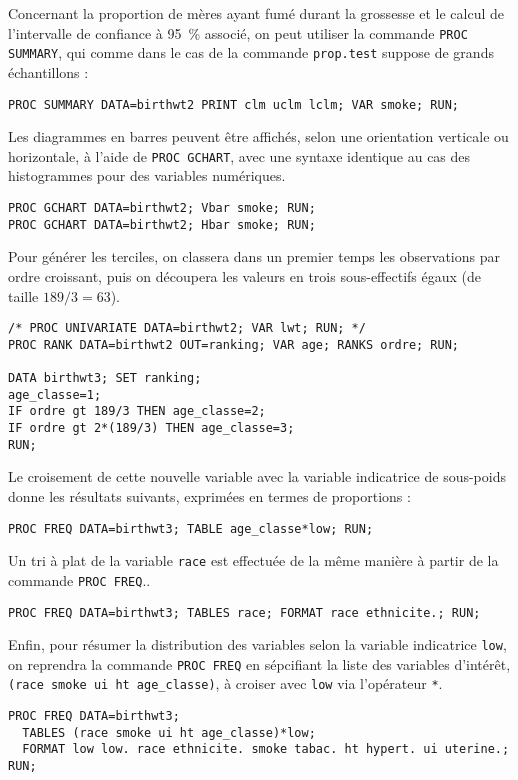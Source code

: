 Concernant la proportion de mères ayant fumé durant la grossesse et
le calcul de l'intervalle de confiance à 95~\% associé, on peut utiliser la
commande \texttt{PROC SUMMARY}, qui comme dans le cas de la commande \R
\texttt{prop.test} suppose de grands échantillons :
\begin{verbatim}
PROC SUMMARY DATA=birthwt2 PRINT clm uclm lclm; VAR smoke; RUN;
\end{verbatim}

Les diagrammes en barres peuvent être affichés, selon une orientation
verticale ou horizontale, à l'aide de \texttt{PROC GCHART}, avec une syntaxe
identique au cas des histogrammes pour des variables numériques.
\begin{verbatim}
PROC GCHART DATA=birthwt2; Vbar smoke; RUN;
PROC GCHART DATA=birthwt2; Hbar smoke; RUN;
\end{verbatim}

Pour générer les terciles, on classera dans un premier temps les
observations par ordre croissant, puis on découpera les valeurs en trois
sous-effectifs égaux (de taille $189/3=63$).
\begin{verbatim}
/* PROC UNIVARIATE DATA=birthwt2; VAR lwt; RUN; */
PROC RANK DATA=birthwt2 OUT=ranking; VAR age; RANKS ordre; RUN;

DATA birthwt3; SET ranking;
age_classe=1;
IF ordre gt 189/3 THEN age_classe=2; 
IF ordre gt 2*(189/3) THEN age_classe=3;
RUN;
\end{verbatim}
Le croisement de cette nouvelle variable avec la variable indicatrice de
sous-poids donne les résultats suivants, exprimées en termes de proportions :
\begin{verbatim}
PROC FREQ DATA=birthwt3; TABLE age_classe*low; RUN;
\end{verbatim}

Un tri à plat de la variable \texttt{race} est effectuée de la même manière
à partir de la commande \texttt{PROC FREQ}..
\begin{verbatim}
PROC FREQ DATA=birthwt3; TABLES race; FORMAT race ethnicite.; RUN;
\end{verbatim}

Enfin, pour résumer la distribution des variables selon la variable
indicatrice \texttt{low}, on reprendra la commande \texttt{PROC FREQ} en
sépcifiant la liste des variables d'intérêt, 
\verb|(race smoke ui ht age_classe)|, à croiser avec \verb|low| via
l'opérateur \texttt{*}.
\begin{verbatim}
PROC FREQ DATA=birthwt3; 
  TABLES (race smoke ui ht age_classe)*low;
  FORMAT low low. race ethnicite. smoke tabac. ht hypert. ui uterine.;
RUN;
\end{verbatim}

